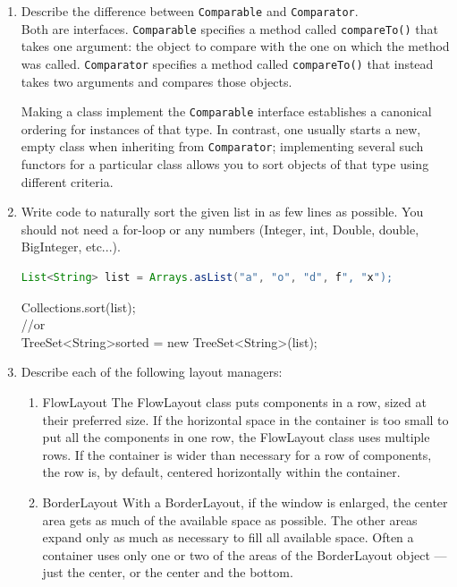 \documentclass[11pt]{article}
\newenvironment{answer}{\large\lstset{basicstyle=\tiny\ttfamily}\color{white} }{}
\newenvironment{answer}{\large\lstset{basicstyle=\large\ttfamily}\color{red} }{}
\begin{document}
\begin{enumerate}
\item Describe the difference between \texttt{Comparable} and \texttt{Comparator}. \\
\begin{answer}
Both are interfaces.
\texttt{Comparable} specifies a method called \texttt{compareTo()} that takes one argument: the object to compare with the one on which the method was called.
\texttt{Comparator} specifies a method called \texttt{compareTo()} that instead takes two arguments and compares those objects.

Making a class implement the \texttt{Comparable} interface establishes a canonical ordering for instances of that type.
In contrast, one usually starts a new, empty class when inheriting from \texttt{Comparator}; implementing several such functors for a particular class allows you to sort objects of that type using different criteria.
\end{answer}



\item Write code to naturally sort the given list in as few lines as possible. You should not need a for-loop or any numbers (Integer, int, Double, double,
BigInteger, etc...).
\begin{lstlisting}[language=java]
List<String> list = Arrays.asList("a", "o", "d", f", "x");
\end{lstlisting}
\begin{answer}
Collections.sort(list);
\\//or
\\TreeSet\textless String\textgreater  sorted = new TreeSet\textless String\textgreater (list);
\end{answer}


\newpage
\item Describe each of the following layout managers:
\begin{enumerate}

\item FlowLayout
\begin{answer}
The FlowLayout class puts components in a row, sized at their preferred size. If the horizontal space in the container is too small to put all the components in one row, the FlowLayout class uses multiple rows. If the container is wider than necessary for a row of components, the row is, by default, centered horizontally within the container. \end{answer}

\item BorderLayout
\begin{answer}
With a BorderLayout, if the window is enlarged, the center area gets as much of the available space as possible. The other areas expand only as much as necessary to fill all available space. Often a container uses only one or two of the areas of the BorderLayout object — just the center, or the center and the bottom. \end{answer}


\end{enumerate}
\end{enumerate}
\end{document}
